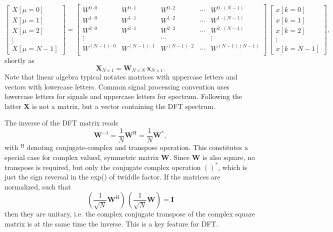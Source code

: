\documentclass[11pt,a4paper,DIV=12]{scrartcl}
\begin{document}
\begin{equation}
\begin{bmatrix}
X[\mu=0]\\
X[\mu=1]\\
X[\mu=2]\\
\vdots\\
X[\mu=N-1]
\end{bmatrix}
=
\begin{bmatrix}
W^{0 \cdot 0} & W^{0 \cdot 1} & W^{0 \cdot 2} & \cdots & W^{0 \cdot (N-1)}\\
W^{1 \cdot 0} & W^{1 \cdot 1} & W^{1 \cdot 2} & \cdots & W^{1 \cdot (N-1)}\\
W^{2 \cdot 0} & W^{2 \cdot 1} & W^{2 \cdot 2} & \cdots & W^{2 \cdot (N-1)}\\
\vdots & & \cdots& & \vdots\\
W^{(N-1) \cdot 0} & W^{(N-1) \cdot 1} & W^{(N-1) \cdot 2} & \cdots & W^{(N-1)(N-1)}\\
\end{bmatrix} \,
\begin{bmatrix}
x[k=0]\\
x[k=1]\\
x[k=2]\\
\vdots\\
x[k=N-1]
\end{bmatrix},
\end{equation}
shortly as
\begin{equation}
\mathbf{X}_{N \times 1} = \mathbf{W}_{N \times N} \, \mathbf{x}_{N \times 1}.
\end{equation}
Note that linear algebra typical notates matrices with uppercase letters and vectors
with lowercase letters. Common signal processing convention uses lowercase letters for
signals and uppercase letters for spectrum. Following the latter $\mathbf{X}$ is
not a matrix, but a vector containing the DFT spectrum.

The inverse of the DFT matrix reads
\begin{equation}
\mathbf{W}^{-1}
= \frac{1}{N} \mathbf{W}^\mathrm{H}
= \frac{1}{N} \mathbf{W}^\mathrm{*},
\end{equation}
with
$^\mathrm{H}$ denoting conjugate-complex and transpose operation.
This constitutes a special case for complex valued, symmetric matrix $\mathbf{W}$.
%
Since $\mathbf{W}$ is also square, no transpose is required, but only the
conjugate complex operation $()^*$, which is just the sign reversal
in the exp() of twiddle factor.
%
If the matrices are normalized, such that
\begin{equation}
(\frac{1}{\sqrt{N}} \mathbf{W}^\mathrm{H}) \, (\frac{1}{\sqrt{N}} \mathbf{W}) = \mathbf{I}
\end{equation}
then they are unitary, i.e. the complex conjugate transpose of the complex
square matrix is at the same time the inverse.
This is a key feature for DFT.
\end{document}
